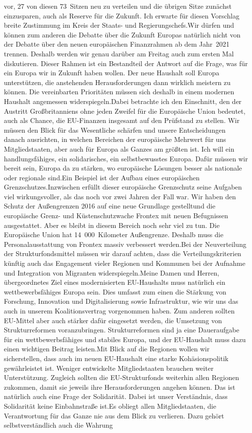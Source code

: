 \documentclass{article}
\begin{document}
vor, 27 von diesen 73 Sitzen neu zu verteilen und die übrigen Sitze zunächst einzusparen, auch als Reserve für die Zukunft. Ich erwarte für diesen Vorschlag breite Zustimmung im Kreis der Staats- und Regierungschefs.Wir dürfen und können zum anderen die Debatte über die Zukunft Europas natürlich nicht von der Debatte über den neuen europäischen Finanzrahmen ab dem Jahr 2021 trennen. Deshalb werden wir genau darüber am Freitag auch zum ersten Mal diskutieren. Dieser Rahmen ist ein Bestandteil der Antwort auf die Frage, was für ein Europa wir in Zukunft haben wollen. Der neue Haushalt soll Europa unterstützen, die anstehenden Herausforderungen dann wirklich meistern zu können. Die vereinbarten Prioritäten müssen sich deshalb in einem modernen Haushalt angemessen widerspiegeln.Dabei betrachte ich den Einschnitt, den der Austritt Großbritanniens ohne jeden Zweifel für die Europäische Union bedeutet, auch als Chance, die EU-Finanzen insgesamt auf den Prüfstand zu stellen. Wir müssen den Blick für das Wesentliche schärfen und unsere Entscheidungen danach ausrichten, in welchen Bereichen der europäische Mehrwert für uns Mitgliedstaaten, aber auch für Europa als Ganzes am größten ist. Ich will ein handlungsfähiges, ein solidarisches, ein selbstbewusstes Europa. Dafür müssen wir bereit sein, Europa da zu stärken, wo europäische Lösungen besser als nationale oder regionale sind.Ein Beispiel ist der Aufbau eines europäischen Grenzschutzes.Inzwischen erfüllt dieser europäische Grenzschutz seine Aufgaben viel wirkungsvoller, als das noch vor zwei Jahren der Fall war. Wir haben den Schutz der Außengrenzen 2016 auf eine neue Grundlage gestelltund die europäische Grenz- und Küstenschutzwache Frontex mit neuen Befugnissen ausgestattet. Aber es bleibt in diesem Bereich noch sehr viel zu tun. Die Europäische Union hat 14 000 Kilometer Außengrenze. Deshalb muss die Personalausstattung von Frontex massiv verbessert werden.Bei der Neuverteilung der Strukturfondsmittel müssen wir darauf achten, dass die Verteilungskriterien künftig auch das Engagement vieler Regionen und Kommunen bei der Aufnahme und Integration von Migranten widerspiegeln.Meine Damen und Herren, übergeordnetes Ziel eines modernisierten EU-Haushalts muss natürlich ein wettbewerbsfähiges Europa sein. Dies umfasst zum einen die Stärkung von Forschung, Innovation und Digitalisierung sowie Infrastruktur, wie wir uns das auch in unserem Koalitionsvertrag vorgenommen haben. Zum anderen sollten EU-Mittel aber auch stärker dafür eingesetzt werden, die Umsetzung von Strukturreformen voranzubringen. Strukturreformen sind ja eine Daueraufgabe für ein wettbewerbsfähiges und stabiles Europa, und der EU-Haushalt muss dazu einen wichtigen Beitrag leisten.Mit Blick auf die Regionen wollen wir sicherstellen, dass auch im neuen EU-Haushalt eine starke Kohäsionspolitik gewährleistet ist. Weniger entwickelte Mitgliedstaaten brauchen weiter Unterstützung. Zugleich sollten die EU-Strukturfonds weiterhin allen Regionen zukommen, damit sie jeweils ihre Herausforderungen angehen können. Das ist natürlich auch eine Frage der Solidarität. Dabei ist unser Verständnis, dass Solidarität keine Einbahnstraße ist.Es obliegt allen Mitgliedstaaten, die Verantwortung für das Ganze nie aus dem Blick zu verlieren. Dazu gehört selbstverständlich auch die Wahrung 
\end{document}
